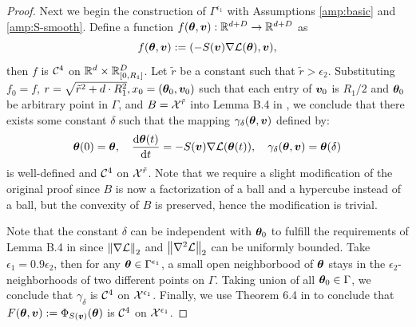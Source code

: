 \begin{proof}
    Next we begin the construction of $\Gamma^{\epsilon_1}$ with Assumptions \ref{amp:basic} and \ref{amp:S-smooth}. Define a function $f({\bm{\theta}}, {\bm{v}}): \mathbb{R}^{d+D} \to \mathbb{R}^{d+D}$ as 
    $$f({\bm{\theta}}, {\bm{v}}) := (-S({\bm{v}})\nabla\mathcal{L}({\bm{\theta}}), {\bm{v}}),$$
    then $f$ is $\mathcal{C}^4$ on $\mathbb{R}^d \times \mathbb{R}_{[0,R_1]}^D$. Let $\tilde{r}$ be a constant such that $\tilde{r} > \epsilon_2$.
    Substituting $f_0 = f$, $r = \sqrt{\tilde{r}^2+d \cdot R_1^2}, x_0 = ({\bm{\theta}}_0, {\bm{v}}_0)$ such that each entry of ${\bm{v}}_0$ is $R_1/2$ and ${\bm{\theta}}_0$ be arbitrary point in $\Gamma$, and $B = \mathcal{X}^{\tilde{r}}$ into Lemma B.4 in \citet{duistermaat2012lie}, we conclude that there exists some constant $\delta$ such that the mapping $\gamma_{\delta}({\bm{\theta}}, {\bm{v}})$ defined by:
    \begin{align*}
        {\bm{\theta}}(0) = {\bm{\theta}}, \quad 
        \frac{\mathrm{d} {\bm{\theta}}(t)}{\mathrm{d} t} = -S({\bm{v}})\nabla \mathcal{L}({\bm{\theta}}(t)), \quad
        \gamma_{\delta}({\bm{\theta}},{\bm{v}}) = {\bm{\theta}}(\delta)
    \end{align*}
    is well-defined and $\mathcal{C}^4$ on $\mathcal{X}^{\tilde{r}}$. Note that we require a slight modification of the original proof since $B$ is now a factorization of a ball and a hypercube instead of a ball, but the convexity of $B$ is preserved, hence the modification is trivial.

    Note that the constant $\delta$ can be independent with ${\bm{\theta}}_0$ to fulfill the requirements of Lemma B.4 in \citet{duistermaat2012lie} since $\left\|\nabla \mathcal{L}\right\|_2$ and $\left\|\nabla^2 \mathcal{L}\right\|_2$ can be uniformly bounded. 
    Take $\epsilon_1 = 0.9\epsilon_2$, then for any ${\bm{\theta}} \in \Gamma^{\epsilon_1}$, a small open neighborbood of ${\bm{\theta}}$ stays in the $\epsilon_2$-neighborhoods of two different points on $\Gamma$. Taking union of all ${\bm{\theta}}_0 \in \Gamma$, we conclude that $\gamma_{\delta}$ is $\mathcal{C}^4$ on $\mathcal{X}^{\epsilon_1}$. Finally, we use Theorem 6.4 in \citet{falconer1983differentiation} to conclude that $F\!\left({\bm{\theta}},{\bm{v}}\right) := \Phi_{S({\bm{v}})}({\bm{\theta}})$ is $\mathcal{C}^4$ on $\mathcal{X}^{\epsilon_1}$. 
\end{proof}